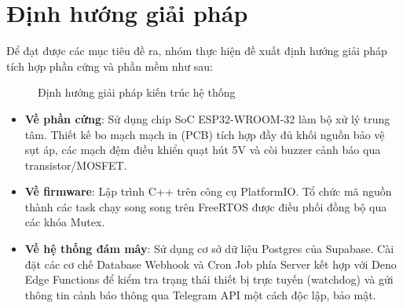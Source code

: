 \section{Định hướng giải pháp}
Để đạt được các mục tiêu đề ra, nhóm thực hiện đề xuất định hướng giải pháp tích hợp phần cứng và phần mềm như sau:

\begin{figure}[H]
    \centering
    \setlength{\fboxsep}{15pt}
    \setlength{\fboxrule}{1.2pt}
    \caption{Định hướng giải pháp kiến trúc hệ thống}
    \label{fig:overviewsolution}
\end{figure}

\begin{itemize}
    \item \textbf{Về phần cứng}: Sử dụng chip SoC ESP32-WROOM-32 làm bộ xử lý trung tâm. Thiết kế bo mạch mạch in (PCB) tích hợp đầy đủ khối nguồn bảo vệ sụt áp, các mạch đệm điều khiển quạt hút 5V và còi buzzer cảnh báo qua transistor/MOSFET.
    \item \textbf{Về firmware}: Lập trình C++ trên công cụ PlatformIO. Tổ chức mã nguồn thành các task chạy song song trên FreeRTOS được điều phối đồng bộ qua các khóa Mutex.
    \item \textbf{Về hệ thống đám mây}: Sử dụng cơ sở dữ liệu Postgres của Supabase. Cài đặt các cơ chế Database Webhook và Cron Job phía Server kết hợp với Deno Edge Functions để kiểm tra trạng thái thiết bị trực tuyến (watchdog) và gửi thông tin cảnh báo thông qua Telegram API một cách độc lập, bảo mật.
\end{itemize}

